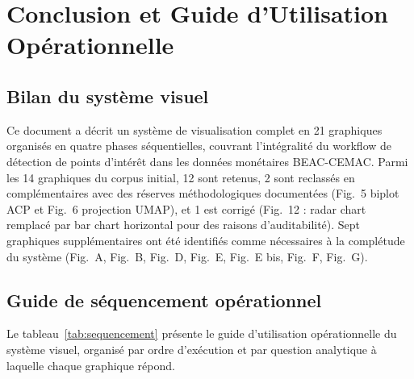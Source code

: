 \documentclass[12pt,a4paper]{article}
\begin{document}
\section{Conclusion et Guide d'Utilisation Opérationnelle}

\subsection{Bilan du système visuel}

Ce document a décrit un système de visualisation complet en 21 graphiques
organisés en quatre phases séquentielles, couvrant l'intégralité du workflow
de détection de points d'intérêt dans les données monétaires BEAC-CEMAC.
Parmi les 14 graphiques du corpus initial, 12 sont retenus, 2 sont reclassés
en complémentaires avec des réserves méthodologiques documentées (Fig.~5
biplot ACP et Fig.~6 projection UMAP), et 1 est corrigé (Fig.~12 : radar
chart remplacé par bar chart horizontal pour des raisons d'auditabilité).
Sept graphiques supplémentaires ont été identifiés comme nécessaires à la
complétude du système (Fig.~A, Fig.~B, Fig.~D, Fig.~E, Fig.~E bis,
Fig.~F, Fig.~G).

\subsection{Guide de séquencement opérationnel}

Le tableau~\ref{tab:sequencement} présente le guide d'utilisation
opérationnelle du système visuel, organisé par ordre d'exécution et par
question analytique à laquelle chaque graphique répond.
\end{document}
